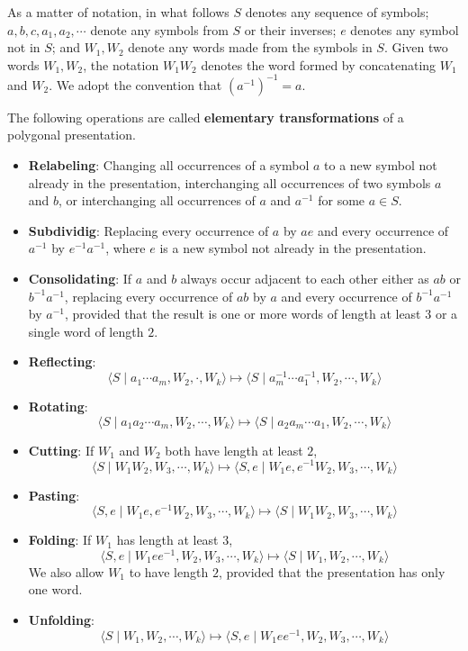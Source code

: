 As a matter of notation, in what follows $S$ denotes any sequence of symbols; $a,b,c,a_1,a_2,\cdots$ denote any symbols from $S$ or their inverses; $e$ denotes any symbol not in $S$; and $W_1,W_2$ denote any words made from the symbols in $S$. Given two words $W_1,W_2$, the notation $W_1W_2$ denotes the word formed by concatenating $W_1$ and $W_2$. We adopt the convention that $(a^{-1})^{-1}=a$.\par
The following operations are called \textbf{elementary transformations} of a polygonal presentation.
\begin{itemize}
\item \textbf{Relabeling}: Changing all occurrences of a symbol $a$ to a new symbol not already in the presentation, interchanging all occurrences of two symbols $a$ and $b$, or interchanging all occurrences of $a$ and $a^{-1}$ for some $a\in S$.
\item \textbf{Subdividig}: Replacing every occurrence of $a$ by $ae$ and every occurrence of $a^{-1}$ by $e^{-1}a^{-1}$, where $e$ is a new symbol not already in the presentation.
\item \textbf{Consolidating}: If $a$ and $b$ always occur adjacent to each other either as $ab$ or $b^{-1}a^{-1}$, replacing every occurrence of $ab$ by $a$ and every occurrence of $b^{-1}a^{-1}$ by $a^{-1}$, provided that the result is one or more words of length at least $3$ or a single word of length $2$.
\item \textbf{Reflecting}: 
\[\langle S\mid a_1\cdots a_m,W_2,\cdot,W_k\rangle\mapsto\langle S\mid a_m^{-1}\cdots a_1^{-1},W_2,\cdots,W_k\rangle\]
\item \textbf{Rotating}: 
\[\langle S\mid a_1a_2\cdots a_m,W_2,\cdots,W_k\rangle\mapsto\langle S\mid a_2a_m\cdots a_1,W_2,\cdots,W_k\rangle\]
\item \textbf{Cutting}: If $W_1$ and $W_2$ both have length at least $2$,
\[\langle S\mid W_1W_2,W_3,\cdots,W_k\rangle\mapsto\langle S,e\mid W_1e,e^{-1}W_2, W_3,\cdots,W_k\rangle\]
\item \textbf{Pasting}:
\[\langle S,e\mid W_1e,e^{-1}W_2, W_3,\cdots,W_k\rangle\mapsto\langle S\mid W_1W_2,W_3,\cdots,W_k\rangle\]
\item \textbf{Folding}: If $W_1$ has length at least $3$,
\[\langle S,e\mid W_1ee^{-1},W_2, W_3,\cdots,W_k\rangle\mapsto\langle S\mid W_1,W_2,\cdots,W_k\rangle\]
We also allow $W_1$ to have length $2$, provided that the presentation has only one
word.
\item \textbf{Unfolding}:
\[\langle S\mid W_1,W_2,\cdots,W_k\rangle\mapsto\langle S,e\mid W_1ee^{-1},W_2, W_3,\cdots,W_k\rangle\]
\end{itemize}
